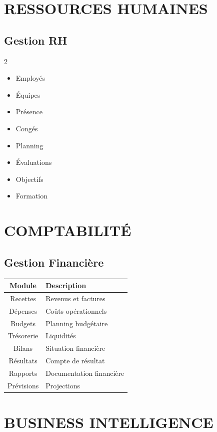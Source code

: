 \documentclass[12pt,a4paper,oneside]{book}
\begin{document}
\chapter{RESSOURCES HUMAINES}

\section{Gestion RH}
\begin{multicols}{2}
\begin{itemize}
\item Employés
\item Équipes
\item Présence
\item Congés
\item Planning
\item Évaluations
\item Objectifs
\item Formation
\end{itemize}
\end{multicols}

\chapter{COMPTABILITÉ}

\section{Gestion Financière}
\begin{center}
\begin{tabular}{|c|p{10cm}|}
\hline
\rowcolor{electronpurple}
\color{white}\textbf{Module} & \color{white}\textbf{Description} \\
\hline
Recettes & Revenus et factures \\
\hline
Dépenses & Coûts opérationnels \\
\hline
Budgets & Planning budgétaire \\
\hline
Trésorerie & Liquidités \\
\hline
Bilans & Situation financière \\
\hline
Résultats & Compte de résultat \\
\hline
Rapports & Documentation financière \\
\hline
Prévisions & Projections \\
\hline
\end{tabular}
\end{center}

\chapter{BUSINESS INTELLIGENCE}
\end{document}
